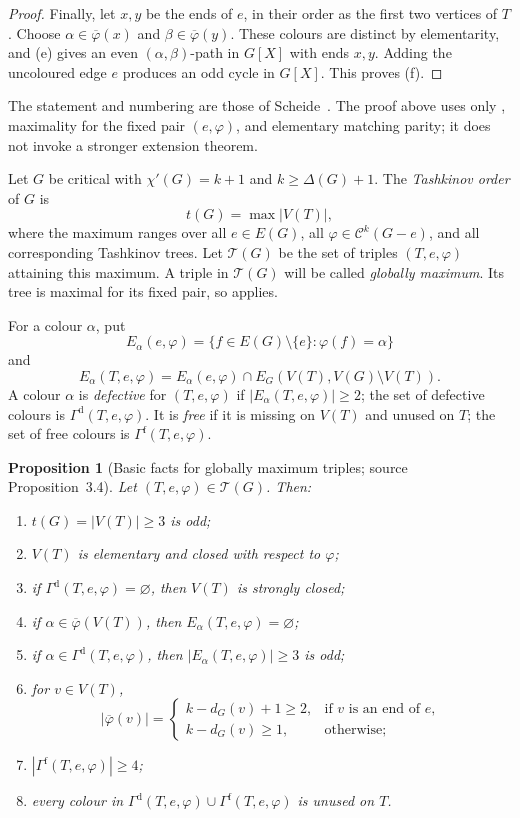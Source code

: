 \documentclass[11pt]{article}
\newtheorem{proposition}[proposition]{Proposition}
\theoremstyle{definition}
\newcommand{\Ccal}{\mathcal C}
\newcommand{\Tcal}{\mathcal T}
\newcommand{\Dcol}{\Gamma^{\mathrm d}}
\newcommand{\Fcol}{\Gamma^{\mathrm f}}
\newcommand{\set}[1]{\{#1\}}
\newcommand{\comp}{\mathbin{\setminus}}
\begin{document}
\begin{proof}
Finally, let $x,y$ be the ends of $e$, in their order as the first two
vertices of $T$. Choose
$\alpha\in\overline\varphi(x)$ and
$\beta\in\overline\varphi(y)$. These colours are distinct by elementarity,
and (e) gives an even $(\alpha,\beta)$-path in $G[X]$ with ends $x,y$.
Adding the uncoloured edge $e$ produces an odd cycle in $G[X]$. This proves
(f).
\end{proof}

The statement and numbering are those of
Scheide~\cite[Theorem~3.3]{S}. The proof above uses only
, maximality for the fixed pair $(e,\varphi)$, and elementary
matching parity; it does not invoke a stronger extension theorem.

Let $G$ be critical with $\chi'(G)=k+1$ and $k\ge\Delta(G)+1$.
The \emph{Tashkinov order} of $G$ is
\begin{equation}
\label{torder}
 t(G)=\max |V(T)|,
\end{equation}
where the maximum ranges over all $e\in E(G)$, all
$\varphi\in\Ccal^k(G-e)$, and all corresponding Tashkinov trees. Let
$\Tcal(G)$ be the set of triples $(T,e,\varphi)$ attaining this maximum. A
triple in $\Tcal(G)$ will be called \emph{globally maximum}. Its tree is
maximal for its fixed pair, so  applies.

For a colour $\alpha$, put
\[
 E_\alpha(e,\varphi)=\set{f\in E(G)\comp\set e:\varphi(f)=\alpha}
\]
and
\[
 E_\alpha(T,e,\varphi)=
 E_\alpha(e,\varphi)\cap E_G(V(T),V(G)\comp V(T)).
\]
A colour $\alpha$ is \emph{defective} for $(T,e,\varphi)$ if
$|E_\alpha(T,e,\varphi)|\ge2$; the set of defective colours is
$\Dcol(T,e,\varphi)$. It is \emph{free} if it is missing on $V(T)$ and
unused on $T$; the set of free colours is $\Fcol(T,e,\varphi)$.

\begin{proposition}[Basic facts for globally maximum triples; source Proposition~3.4]
\label{Scheide-Proposition-3.4}\label{maximum-triple-facts}
Let $(T,e,\varphi)\in\Tcal(G)$. Then:
\begin{enumerate}[label=\textup{(\alph*)}]
\item $t(G)=|V(T)|\ge3$ is odd;
\item $V(T)$ is elementary and closed with respect to $\varphi$;
\item if $\Dcol(T,e,\varphi)=\varnothing$, then $V(T)$ is strongly closed;
\item if $\alpha\in\overline\varphi(V(T))$, then
      $E_\alpha(T,e,\varphi)=\varnothing$;
\item if $\alpha\in\Dcol(T,e,\varphi)$, then
      $|E_\alpha(T,e,\varphi)|\ge3$ is odd;
\item for $v\in V(T)$,
\[
 |\overline\varphi(v)|=
 \begin{cases}
 k-d_G(v)+1\ge2,&\text{if $v$ is an end of $e$},\\
 k-d_G(v)\ge1,&\text{otherwise};
 \end{cases}
\]
\item $|\Fcol(T,e,\varphi)|\ge4$;
\item every colour in
      $\Dcol(T,e,\varphi)\cup\Fcol(T,e,\varphi)$ is unused on $T$.
\end{enumerate}
\end{proposition}
\end{document}
